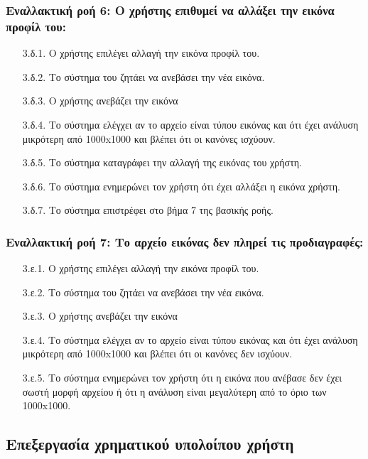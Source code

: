 \documentclass[12pt,a4paper]{article}
\begin{document}
\subsubsection*{Εναλλακτική ροή 6: Ο χρήστης επιθυμεί να αλλάξει την εικόνα προφίλ του:}
\begin{enumerate}
    \item [3.δ.1.] Ο χρήστης επιλέγει αλλαγή την εικόνα προφίλ του.
    \item [3.δ.2.] Το σύστημα του ζητάει να ανεβάσει την νέα εικόνα.
    \item [3.δ.3.] Ο χρήστης ανεβάζει την εικόνα
    \item [3.δ.4.] Το σύστημα ελέγχει αν το αρχείο είναι τύπου εικόνας και ότι έχει ανάλυση μικρότερη από 1000x1000 και βλέπει ότι οι κανόνες ισχύουν.
    \item [3.δ.5.] Το σύστημα καταγράφει την αλλαγή της εικόνας του χρήστη.
    \item [3.δ.6.] Το σύστημα ενημερώνει τον χρήστη ότι έχει αλλάξει η εικόνα χρήστη.
    \item [3.δ.7.] Το σύστημα επιστρέφει στο βήμα 7 της βασικής ροής.
\end{enumerate}

\subsubsection*{Εναλλακτική ροή 7: Το αρχείο εικόνας δεν πληρεί τις προδιαγραφές:}
\begin{enumerate}
    \item [3.ε.1.] Ο χρήστης επιλέγει αλλαγή την εικόνα προφίλ του.
    \item [3.ε.2.] Το σύστημα του ζητάει να ανεβάσει την νέα εικόνα.
    \item [3.ε.3.] Ο χρήστης ανεβάζει την εικόνα
    \item [3.ε.4.] Το σύστημα ελέγχει αν το αρχείο είναι τύπου εικόνας και ότι έχει ανάλυση μικρότερη από 1000x1000 και βλέπει ότι οι κανόνες δεν ισχύουν.
    \item [3.ε.5.] Το σύστημα ενημερώνει τον χρήστη ότι η εικόνα που ανέβασε δεν έχει σωστή μορφή αρχείου ή ότι η ανάλυση είναι μεγαλύτερη από το όριο των 1000x1000.
\end{enumerate}

\subsection{Επεξεργασία χρηματικού υπολοίπου χρήστη}
\end{document}
